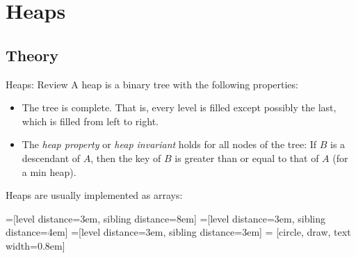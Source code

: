 \documentclass[9pt]{beamer}
\begin{document}
\section{Heaps}
\subsection{Theory}
\begin{frame}[fragile]{Heaps: Review}
  A heap is a binary tree with the following properties:
  \begin{itemize}
    \item
      The tree is complete. That is, every level is filled except possibly
      the last, which is filled from left to right.
    \item
      The {\em heap property} or {\em heap invariant} holds for all nodes of
      the tree: If $B$ is a descendant of $A$, then the key of $B$ is
      greater than or equal to that of $A$ (for a min heap).
  \end{itemize}

  \pause
  Heaps are usually implemented as arrays:

  =[level distance=3em, sibling distance=8em]
  =[level distance=3em, sibling distance=4em]
  =[level distance=3em, sibling distance=3em]
   = [circle, draw, text width=0.8em]

\end{frame}
\end{document}

